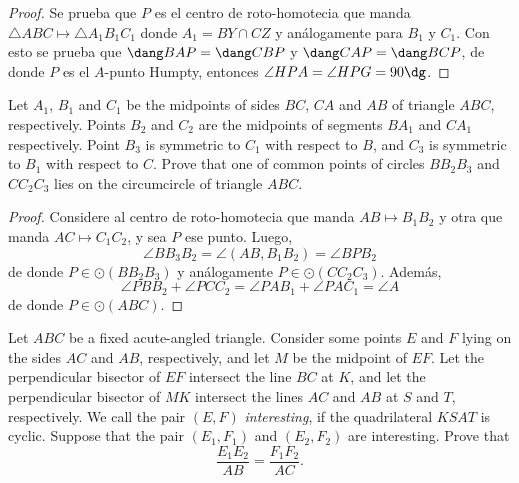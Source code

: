 \begin{proof}
	Se prueba que $P$ es el centro de roto-homotecia que manda $\triangle ABC\mapsto\triangle A_1B_1C_1$ donde $A_1=BY\cap CZ$ y análogamente para $B_1$ y $C_1$. Con esto se prueba que $\dang BAP=\dang CBP$ y $\dang CAP=\dang BCP$, de donde $P$ es el $A$-punto Humpty, entonces $\angle HPA=\angle HPG=90\dg$.
\end{proof}

\begin{probEG}
	Let $A_1$, $B_1$ and $C_1$ be the midpoints of sides $BC$, $CA$ and $AB$ of triangle $ABC$, respectively. Points $B_2$ and $C_2$ are the midpoints of segments $BA_1$ and $CA_1$ respectively. Point $B_3$ is symmetric to $C_1$ with respect to $B$, and $C_3$ is symmetric to $B_1$ with respect to $C$.
Prove that one of common points of circles $BB_2B_3$ and $CC_2C_3$ lies on the circumcircle of triangle $ABC$.
\end{probEG}

\begin{proof}
	Considere al centro de roto-homotecia que manda $AB\mapsto B_1B_2$ y otra que manda $AC\mapsto C_1C_2$, y sea $P$ ese punto. Luego,
	\[\angle BB_3B_2=\angle(AB,B_1B_2)=\angle BPB_2\]
	de donde $P\in\odot(BB_2B_3)$ y análogamente $P\in\odot(CC_2C_3)$. Además,
	\[\angle PBB_2+\angle PCC_2=\angle PAB_1+\angle PAC_1=\angle A\]
	de donde $P\in\odot(ABC)$.
\end{proof}


\begin{problem}
	Let $ABC$ be a fixed acute-angled triangle. Consider some points $E$ and $F$ lying on the sides $AC$ and $AB$, respectively, and let $M$ be the midpoint of $EF$. Let the perpendicular bisector of $EF$ intersect the line $BC$ at $K$, and let the perpendicular bisector of $MK$ intersect the lines $AC$ and $AB$ at $S$ and $T$, respectively. We call the pair $(E,F)$ \emph{interesting}, if the quadrilateral $KSAT$ is cyclic. Suppose that the pair $(E_1,F_1)$ and $(E_2,F_2)$ are interesting. Prove that
	\[\frac{E_1E_2}{AB}=\frac{F_1F_2}{AC}.\]
\end{problem}

